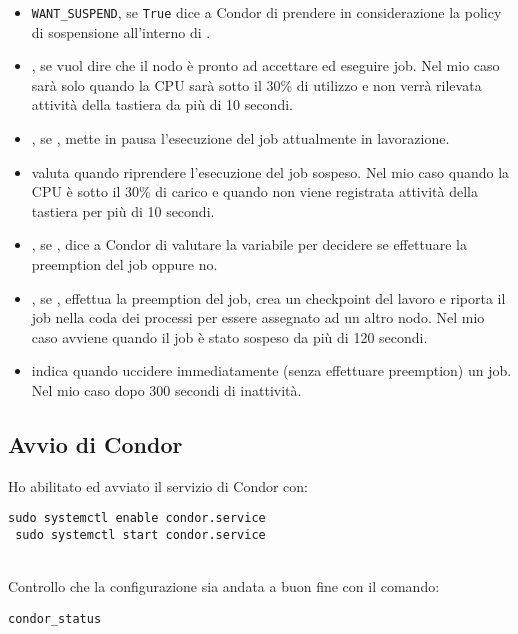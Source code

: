 \begin{itemize}
	\item \lstinline[style=cmd]|WANT_SUSPEND|, se \lstinline[style=cmd]|True| dice a Condor di prendere in considerazione la policy di sospensione all'interno di .
	\item {}, se  vuol dire che il nodo \`{e} pronto ad accettare ed eseguire job. Nel mio caso sar\`{a}  solo quando la CPU sar\`{a} sotto il 30\% di utilizzo e non verr\`{a} rilevata attivit\`{a} della tastiera da pi\`{u} di 10 secondi.
	\item {}, se , mette in pausa l'esecuzione del job attualmente in lavorazione.
	\item {} valuta quando riprendere l'esecuzione del job sospeso. Nel mio caso quando la CPU \`{e} sotto il 30\% di carico e quando non viene registrata attivit\`{a} della tastiera per pi\`{u} di 10 secondi.
	\item {}, se , dice a Condor di valutare la variabile  per decidere se effettuare la preemption del job oppure no.
	\item {}, se , effettua la preemption del job, crea un checkpoint del lavoro e riporta il job nella coda dei processi per essere assegnato ad un altro nodo. Nel mio caso avviene quando il job \`{e} stato sospeso da pi\`{u} di 120 secondi.
	\item {} indica quando uccidere immediatamente (senza effettuare preemption) un job. Nel mio caso dopo 300 secondi di inattivit\`{a}.
\end{itemize}

\subsection{Avvio di Condor}

Ho abilitato ed avviato il servizio di Condor con:

\begin{lstlisting}[style=cmd]
 sudo systemctl enable condor.service
 sudo systemctl start condor.service
\end{lstlisting}
\ \\
Controllo che la configurazione sia andata a buon fine con il comando:

\begin{lstlisting}[style=cmd]
 condor_status
\end{lstlisting}

